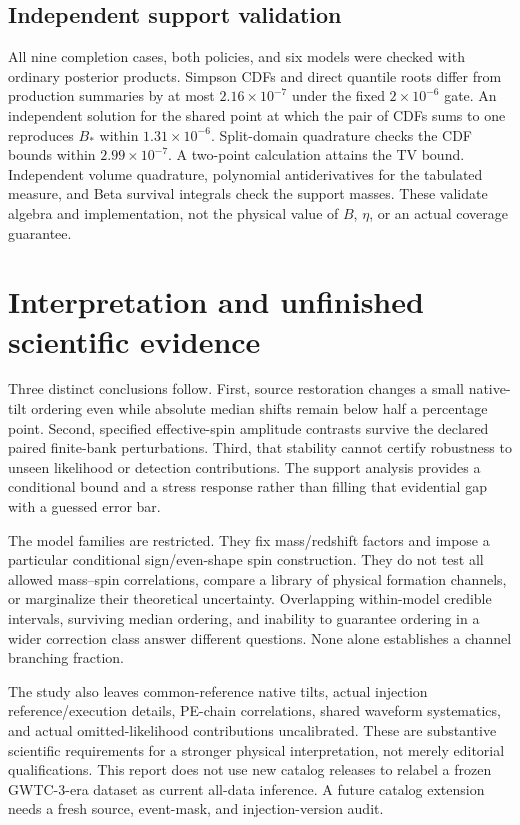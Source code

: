 \subsection{Independent support validation}
All nine completion cases, both policies, and six models were checked with ordinary posterior products. Simpson CDFs and direct quantile roots differ from production summaries by at most $2.16\times10^{-7}$ under the fixed $2\times10^{-6}$ gate. An independent solution for the shared point at which the pair of CDFs sums to one reproduces $B_*$ within $1.31\times10^{-6}$. Split-domain quadrature checks the CDF bounds within $2.99\times10^{-7}$. A two-point calculation attains the TV bound. Independent volume quadrature, polynomial antiderivatives for the tabulated measure, and Beta survival integrals check the support masses. These validate algebra and implementation, not the physical value of $B$, $\eta$, or an actual coverage guarantee.

\FloatBarrier
\section{Interpretation and unfinished scientific evidence}
Three distinct conclusions follow. First, source restoration changes a small native-tilt ordering even while absolute median shifts remain below half a percentage point. Second, specified effective-spin amplitude contrasts survive the declared paired finite-bank perturbations. Third, that stability cannot certify robustness to unseen likelihood or detection contributions. The support analysis provides a conditional bound and a stress response rather than filling that evidential gap with a guessed error bar.

The model families are restricted. They fix mass/redshift factors and impose a particular conditional sign/even-shape spin construction. They do not test all allowed mass--spin correlations, compare a library of physical formation channels, or marginalize their theoretical uncertainty. Overlapping within-model credible intervals, surviving median ordering, and inability to guarantee ordering in a wider correction class answer different questions. None alone establishes a channel branching fraction.

The study also leaves common-reference native tilts, actual injection reference/execution details, PE-chain correlations, shared waveform systematics, and actual omitted-likelihood contributions uncalibrated. These are substantive scientific requirements for a stronger physical interpretation, not merely editorial qualifications. This report does not use new catalog releases to relabel a frozen GWTC-3-era dataset as current all-data inference. A future catalog extension needs a fresh source, event-mask, and injection-version audit.

